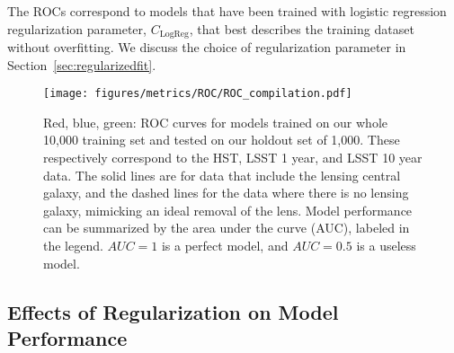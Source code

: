 \documentclass{emulateapj}
\begin{document}
The ROCs correspond to models that have been trained with logistic
regression regularization parameter, $C_\text{LogReg}$, that best
describes the training dataset without overfitting.  We discuss the
choice of regularization parameter in
Section~\ref{sec:regularizedfit}.

\begin{figure}[t]\label{fig:ROCcompilation}
\begin{center}
\texttt{[image: figures/metrics/ROC/ROC\_compilation.pdf]}
\caption{Red, blue, green: ROC curves for models trained on our whole
  10,000 training set and tested on our holdout set of 1,000.  These
  respectively correspond to the HST, LSST 1 year, and LSST 10 year
  data.  The solid lines are for data that include the lensing central
  galaxy, and the dashed lines for the data where there is no lensing
  galaxy, mimicking an ideal removal of the lens.  Model performance
  can be summarized by the area under the curve (AUC), labeled in the
  legend. $AUC=1$ is a perfect model, and $AUC=0.5$ is a useless
  model.}
\end{center}
\end{figure}

\subsection{Effects of Regularization on Model Performance}\label{sec:regularization}
\end{document}
